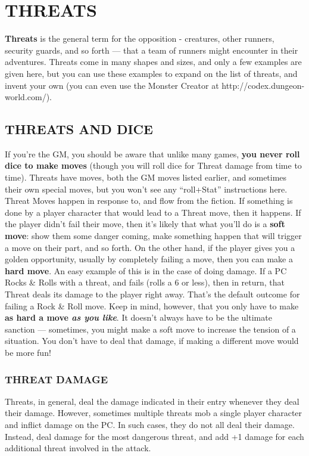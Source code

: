 \documentclass[oneside,10pt]{article}
\begin{document}
\section{THREATS}
\begin{multicols}{2}
\textbf{Threats} is the general term for the opposition - creatures, 
other runners, security guards, and so forth — that a team of 
  runners might encounter in their adventures. Threats come in 
  many shapes and sizes, and only a few examples are given 
  here, but you can use these examples to expand on the list of 
  threats, and invent your own (you can even use the Monster 
  Creator at http://codex.dungeon-world.com/). 

\subsection{THREATS AND DICE}
If you’re the GM, you should be aware that unlike many
games, \textbf{you never roll dice to make moves} (though you will
roll dice for Threat damage from time to time).
Threats have moves, both the GM moves listed earlier, and
sometimes their own special moves, but you won’t see any
``roll+Stat'' instructions here. Threat Moves happen in response to, and flow from the fiction. If something is done by
a player character that would lead to a Threat move, then it
happens. If the player didn’t fail their move, then it’s likely
that what you’ll do is a \textbf{soft move}: show them some danger
coming, make something happen that will trigger a move on
their part, and so forth.
On the other hand, if the player gives you a golden opportunity, usually by completely failing a move, then you can
make a \textbf{hard move}. An easy example of this is in the case of
doing damage. If a PC Rocks \& Rolls with a threat, and fails
(rolls a 6 or less), then in return, that Threat deals its damage
to the player right away. That’s the default outcome for failing
a Rock \& Roll move.
Keep in mind, however, that you only have to make \textbf{as hard
a move \textit{as you like}}. It doesn’t always have to be the ultimate
sanction — sometimes, you might make a soft move to increase the tension of a situation. You don’t have to deal that
damage, if making a different move would be more fun!

\subsubsection{THREAT DAMAGE}
Threats, in general, deal the damage indicated in their entry
whenever they deal their damage. However, sometimes multiple threats mob a single player character and inflict damage
on the PC. In such cases, they do not all deal their damage.
Instead, deal damage for the most dangerous threat, and add
+1 damage for each additional threat involved in
the attack.


\end{multicols}
\end{document}
